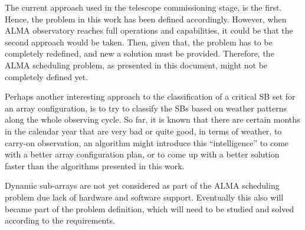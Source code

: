 The current approach used in the telescope commissioning stage, is the first. Hence, the problem in this work has been defined accordingly. However, when ALMA observatory reaches full operations and capabilities, it could be that the second approach would be taken. Then, given that, the problem has to be completely redefined, and new a solution must be provided. Therefore, the ALMA scheduling problem, as presented in this document, might not be completely defined yet.

Perhaps another interesting approach to the classification of a critical SB set for an array configuration, is to try to classify the SBs based on weather patterns along the whole observing cycle. So far, it is known that there are certain months in the calendar year that are very bad or quite good, in terms of weather, to carry-on observation, an algorithm might introduce this ``intelligence'' to come with a better array configuration plan, or to come up with a better solution faster than the algorithms presented in this work.

Dynamic sub-arrays are not yet considered as part of the ALMA scheduling problem due lack of hardware and software support. Eventually this also will became part of the problem definition, which will need to be studied and solved according to the requirements. 